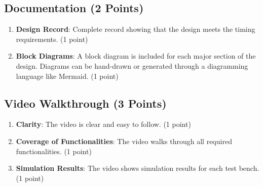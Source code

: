 \subsection*{Documentation (2 Points)}

\begin{enumerate}
    \item \textbf{Design Record}: Complete record showing that the design meets the timing requirements. (1 point)
    \item \textbf{Block Diagrams}: A block diagram is included for each major section of the design. Diagrams can be hand-drawn or generated through a diagramming language like Mermaid. (1 point)
\end{enumerate}

\subsection*{Video Walkthrough (3 Points)}

\begin{enumerate}
    \item \textbf{Clarity}: The video is clear and easy to follow. (1 point)
    \item \textbf{Coverage of Functionalities}: The video walks through all required functionalities. (1 point)
    \item \textbf{Simulation Results}: The video shows simulation results for each test bench. (1 point)
\end{enumerate}
